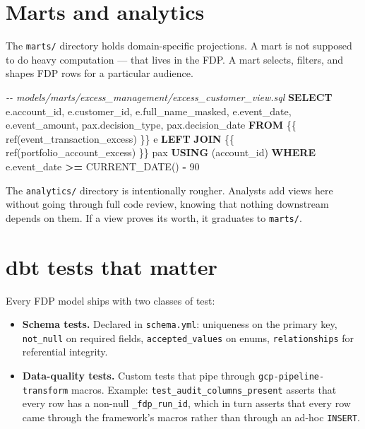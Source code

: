 \documentclass[
  11pt,
  british,
  oneside]{book}
\newenvironment{Shaded}{\begin{snugshade}}{\end{snugshade}}
\newcommand{\CommentTok}[1]{\textcolor[rgb]{0.56,0.35,0.01}{\textit{#1}}}
\newcommand{\DecValTok}[1]{\textcolor[rgb]{0.00,0.00,0.81}{#1}}
\newcommand{\FunctionTok}[1]{\textcolor[rgb]{0.00,0.00,0.00}{#1}}
\newcommand{\KeywordTok}[1]{\textcolor[rgb]{0.13,0.29,0.53}{\textbf{#1}}}
\newcommand{\NormalTok}[1]{#1}
\newcommand{\OperatorTok}[1]{\textcolor[rgb]{0.81,0.36,0.00}{\textbf{#1}}}
\newcommand{\StringTok}[1]{\textcolor[rgb]{0.31,0.60,0.02}{#1}}
\providecommand{\tightlist}{%
  \setlength{\itemsep}{0pt}\setlength{\parskip}{0pt}}
\begin{document}
\hypertarget{marts-and-analytics}{%
\section{Marts and analytics}\label{marts-and-analytics}}

The \texttt{marts/} directory holds domain-specific projections. A mart
is not supposed to do heavy computation --- that lives in the FDP. A
mart selects, filters, and shapes FDP rows for a particular audience.

\begin{Shaded}
\begin{Highlighting}[]
\CommentTok{{-}{-} models/marts/excess\_management/excess\_customer\_view.sql}
\KeywordTok{SELECT}
\NormalTok{    e.account\_id,}
\NormalTok{    e.customer\_id,}
\NormalTok{    e.full\_name\_masked,}
\NormalTok{    e.event\_date,}
\NormalTok{    e.event\_amount,}
\NormalTok{    pax.decision\_type,}
\NormalTok{    pax.decision\_date}
\KeywordTok{FROM}\NormalTok{ \{\{ }\FunctionTok{ref}\NormalTok{(}\StringTok{\textquotesingle{}event\_transaction\_excess\textquotesingle{}}\NormalTok{) \}\} e}
\KeywordTok{LEFT} \KeywordTok{JOIN}\NormalTok{ \{\{ }\FunctionTok{ref}\NormalTok{(}\StringTok{\textquotesingle{}portfolio\_account\_excess\textquotesingle{}}\NormalTok{) \}\} pax}
    \KeywordTok{USING}\NormalTok{ (account\_id)}
\KeywordTok{WHERE}\NormalTok{ e.event\_date }\OperatorTok{\textgreater{}=} \FunctionTok{CURRENT\_DATE}\NormalTok{() }\OperatorTok{{-}} \DecValTok{90}
\end{Highlighting}
\end{Shaded}

The \texttt{analytics/} directory is intentionally rougher. Analysts add
views here without going through full code review, knowing that nothing
downstream depends on them. If a view proves its worth, it graduates to
\texttt{marts/}.

\hypertarget{dbt-tests-that-matter}{%
\section{dbt tests that matter}\label{dbt-tests-that-matter}}

Every FDP model ships with two classes of test:

\begin{itemize}
\tightlist
\item
  \textbf{Schema tests.} Declared in \texttt{schema.yml}: uniqueness on
  the primary key, \texttt{not\_null} on required fields,
  \texttt{accepted\_values} on enums, \texttt{relationships} for
  referential integrity.
\item
  \textbf{Data-quality tests.} Custom tests that pipe through
  \texttt{gcp-pipeline-transform} macros. Example:
  \texttt{test\_audit\_columns\_present} asserts that every row has a
  non-null \texttt{\_fdp\_run\_id}, which in turn asserts that every row
  came through the framework's macros rather than through an ad-hoc
  \texttt{INSERT}.
\end{itemize}
\end{document}
